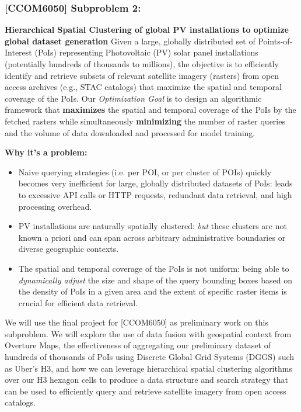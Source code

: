 \subsubsection{[CCOM6050] Subproblem 2:} 
    \textbf{Hierarchical Spatial Clustering of global PV installations to optimize global dataset generation} 
    Given a large, globally distributed set of Points-of-Interest (PoIs) representing Photovoltaic (PV) solar panel installations (potentially hundreds of thousands to millions), 
    the objective is to efficiently identify and retrieve subsets of relevant satellite imagery (rasters) from open access archives (e.g., STAC catalogs) that maximize the spatial and temporal coverage of the PoIs. 
    Our \textit{Optimization Goal} is to design an algorithmic framework that \textbf{maximizes} the spatial and temporal coverage of the PoIs by the fetched rasters while simultaneously 
    \textbf{minimizing} the number of raster queries and the volume of data downloaded and processed for model training. 

    \textbf{Why it's a problem:} 
    \begin{itemize}
        \item Naive querying strategies (i.e. per POI, or per cluster of POIs) quickly becomes very inefficient for large, globally distributed datasets of PoIs: 
        leads to excessive API calls or HTTP requests, redundant data retrieval, and high processing overhead.
        \item PV installations are naturally spatially clustered: \textit{but} these clusters are not known a priori and can span across arbitrary administrative boundaries or diverse geographic contexts.
        \item The spatial and temporal coverage of the PoIs is not uniform: being able to \textit{dynamically adjust} the size and shape of the query bounding boxes based on the density of PoIs in a given area and the extent of specific raster items is crucial for efficient data retrieval.
    \end{itemize}

    We will use the final project for [CCOM6050] as preliminary work on this subproblem. We will explore the use of data fusion with geospatial context from Overture Maps, the effectiveness of aggregating our 
    preliminary dataset of hundreds of thousands of PoIs using Discrete Global Grid Systems (DGGS) such as Uber's H3, and how we can leverage hierarchical spatial clustering algorithms over our H3 hexagon cells to 
    produce a data structure and search strategy that can be used to efficiently query and retrieve satellite imagery from open access catalogs.  

